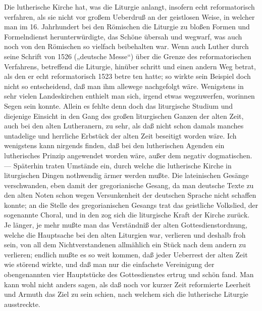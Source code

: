 Die lutherische Kirche hat, was die Liturgie anlangt, insofern echt reformatorisch verfahren, als sie nicht vor großem Ueberdruß an der geistlosen Weise, in welcher man im 16. Jahrhundert bei den Römischen die Liturgie zu bloßen Formen und Formelndienst herunterwürdigte, das Schöne übersah und wegwarf, was auch noch von den Römischen so vielfach beibehalten war. Wenn auch Luther durch seine Schrift von 1526 („deutsche Messe“) über die Grenze des reformatorischen Verfahrens, betreffend die Liturgie, hinüber schritt und einen andern Weg betrat, als den er echt reformatorisch 1523 betre%
ten hatte; so wirkte sein Beispiel doch nicht so entscheidend, daß man ihm allewege nachgefolgt wäre. Wenigstens in sehr vielen Landeskirchen enthielt man sich, irgend etwas wegzuwerfen, worinnen Segen sein konnte. Allein es fehlte denn doch das liturgische Studium und diejenige Einsicht in den Gang des großen liturgischen Ganzen der alten Zeit, auch bei den alten Lutheranern, zu sehr, als daß nicht schon damals manches untadelige und herrliche Erbstück der alten Zeit beseitigt worden wäre. Ich wenigstens kann nirgends finden, daß bei den lutherischen Agenden ein lutherisches Prinzip angewendet worden wäre, außer dem negativ dogmatischen. — Späterhin traten Umstände ein, durch welche die lutherische Kirche in liturgischen Dingen nothwendig ärmer werden mußte. Die lateinischen Gesänge verschwanden, eben damit der gregorianische Gesang, da man deutsche Texte zu den alten Noten schon wegen Versunkenheit der deutschen Sprache nicht schaffen konnte; an die Stelle des gregorianischen Gesangs trat das geistliche Volkslied, der sogenannte Choral, und in den zog sich die liturgische Kraft der Kirche zurück. Je länger, je mehr mußte man das Verständniß der alten Gottesdienstordnung, welche die Hauptsache bei den alten Liturgien war, verlieren und deshalb froh sein, von all dem Nichtverstandenen allmählich ein Stück nach dem andern zu verlieren; endlich mußte es so weit kommen, daß jeder Ueberrest der alten Zeit wie störend wirkte, und daß man nur die einfachste Vereinigung der obengenannten vier Hauptstücke des Gottesdienstes ertrug und schön fand. Man kann wohl nicht anders sagen, als daß noch vor
kurzer Zeit reformierte Leerheit und Armuth das Ziel zu sein schien, nach welchem sich die lutherische Liturgie ausstreckte.


